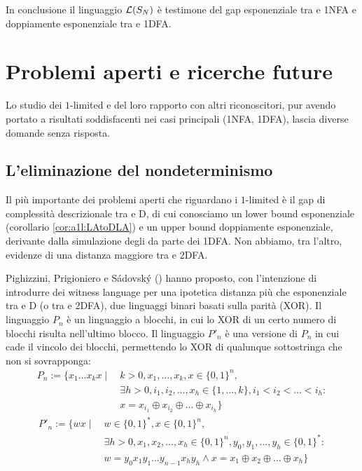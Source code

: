 In conclusione il linguaggio $\mathcal L(S_N)$ è testimone del gap esponenziale tra  e 1NFA e doppiamente esponenziale tra  e 1DFA.



\section{Problemi aperti e ricerche future}
Lo studio dei $1$-limited e del loro rapporto con altri riconoscitori, pur avendo portato a risultati soddisfacenti nei casi principali (1NFA, 1DFA), lascia diverse domande senza risposta.


\subsection{L'eliminazione del nondeterminismo}
Il più importante dei problemi aperti che riguardano i $1$-limited è il gap di complessità descrizionale tra  e D, di cui conosciamo un lower bound esponenziale (corollario \ref{cor:a1l:LAtoDLA}) e un upper bound doppiamente esponenziale, derivante dalla simulazione degli  da parte dei 1DFA. Non abbiamo, tra l'altro, evidenze di una distanza maggiore tra  e 2DFA.

Pighizzini, Prigioniero e Sádovský (\cite{Pighizzini:22:limitedwitness}) hanno proposto, con l'intenzione di introdurre dei witness language per una ipotetica distanza più che esponenziale tra  e D (o tra  e 2DFA), due linguaggi binari basati sulla parità (XOR). Il linguaggio $P_n$ è un linguaggio a blocchi, in cui lo XOR di un certo numero di blocchi risulta nell'ultimo blocco. Il linguaggio $P'_n$ è una versione di $P_n$ in cui cade il vincolo dei blocchi, permettendo lo XOR di qualunque sottostringa che non si sovrapponga:
\begin{align*}
	P_n := \{  x_1\dots x_kx \mid ~ & k>0, x_1,\dots,x_k,x\in\{0,1\}^n,                                \\
	                                & \exists h>0,i_1,i_2,\dots,x_h\in\{1,\dots,k\},i_1<i_2<\dots<i_h: \\
	                                & x=x_{i_1}\oplus x_{i_2}\oplus\dots\oplus x_{i_h}\}
\end{align*}
\begin{align*}
	P'_n := \{  wx \mid ~ & w\in\{0,1\}^*,x\in\{0,1\}^n,                                              \\
	                      & \exists h>0,x_1,x_2,\dots,x_h\in\{0,1\}^n,y_0,y_1,\dots,y_h\in\{0,1\}^*:  \\
	                      & w=y_0x_1y_1\dots y_{n-1}x_hy_h \land x=x_1\oplus x_2\oplus\dots\oplus x_h\}
\end{align*}

